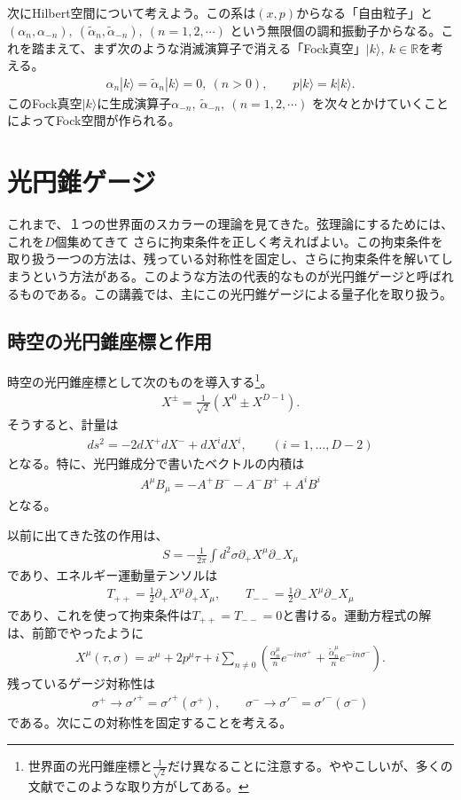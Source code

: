 \documentclass[report,paper=a4, fontsize=12pt, line_length=16cm, number_of_lines=33,dvipdfmx]{jlreq}
\numberwithin{equation}{chapter}
\numberwithin{equation}{section}
\newcommand{\Rb}{\mathbb{R}}
\newcommand{\del}{\partial}
\newcommand{\alphat}{\tilde{\alpha}}
\begin{document}
次にHilbert空間について考えよう。この系は$(x,p)$からなる「自由粒子」と$(\alpha_n,\alpha_{-n}), \ (\alphat_n,\alphat_{-n}),\ (n=1,2,\cdots)$ という無限個の調和振動子からなる。これを踏まえて、まず次のような消滅演算子で消える「Fock真空」$|k\rangle,\ k\in \Rb$を考える。
\begin{align}
\alpha_n|k\rangle=\alphat_n|k\rangle=0, \ (n>0),\qquad p|k\rangle=k |k\rangle.
\end{align}
このFock真空$|k\rangle$に生成演算子$\alpha_{-n},\ \alphat_{-n},\ (n=1,2,\cdots)$ を次々とかけていくことによってFock空間が作られる。

\section{光円錐ゲージ}
これまで、１つの世界面のスカラーの理論を見てきた。弦理論にするためには、これを$D$個集めてきて
さらに拘束条件を正しく考えればよい。この拘束条件を取り扱う一つの方法は、残っている対称性を固定し、さらに拘束条件を解いてしまうという方法がある。このような方法の代表的なものが光円錐ゲージと呼ばれるものである。この講義では、主にこの光円錐ゲージによる量子化を取り扱う。

\subsection{時空の光円錐座標と作用}
時空の光円錐座標として次のものを導入する\footnote{世界面の光円錐座標と$\frac{1}{\sqrt{2}}$だけ異なることに注意する。ややこしいが、多くの文献でこのような取り方がしてある。}。
\begin{align}
X^{\pm}=\frac{1}{\sqrt{2}} (X^0\pm X^{D-1}).
\end{align}
そうすると、計量は
\begin{align}
ds^2=-2dX^{+}dX^{-}+dX^{i}dX^{i},\qquad (i=1,\dots,D-2)
\end{align}
となる。特に、光円錐成分で書いたベクトルの内積は
\begin{align}
A^{\mu}B_{\mu}=-A^{+}B^{-}-A^{-}B^{+}+A^{i}B^{i}
\end{align}
となる。

以前に出てきた弦の作用は、
\begin{align}
S=-\frac{1}{2\pi}\int d^2\sigma \del_{+}X^{\mu}\del_{-}X_{\mu}
\end{align}
であり、エネルギー運動量テンソルは
\begin{align}
T_{++}=\frac12 \del_{+}X^{\mu}\del_{+}X_{\mu},\qquad
T_{--}=\frac12 \del_{-}X^{\mu}\del_{-}X_{\mu}
\label{EMtensor}
\end{align}
であり、これを使って拘束条件は$T_{++}=T_{--}=0$と書ける。運動方程式の解は、前節でやったように
\begin{align}
X^{\mu}(\tau,\sigma)=x^{\mu}+2p^{\mu}\tau+i\sum_{n\ne 0} \left(
\frac{\alpha^{\mu}_{n}}{n}e^{-in\sigma^{+}}
+\frac{\alphat^{\mu}_{n}}{n}e^{-in\sigma^{-}}
\right).
\end{align}
残っているゲージ対称性は
\begin{align}
\sigma^{+}\to \sigma'^{+}=\sigma'^{+}(\sigma^{+})
,\qquad \sigma^{-}\to \sigma'^{-}=\sigma'^{-}(\sigma^{-})
\label{residual-gauge}
\end{align}
である。次にこの対称性を固定することを考える。
\end{document}
